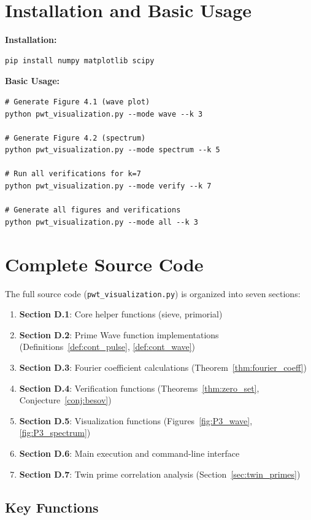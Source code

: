 ﻿\documentclass[12pt,a4paper]{report}
\theoremstyle{plain}
\theoremstyle{definition}
\begin{document}
\section{Installation and Basic Usage}

\textbf{Installation:}
\begin{verbatim}
pip install numpy matplotlib scipy
\end{verbatim}

\textbf{Basic Usage:}
\begin{verbatim}
# Generate Figure 4.1 (wave plot)
python pwt_visualization.py --mode wave --k 3

# Generate Figure 4.2 (spectrum)
python pwt_visualization.py --mode spectrum --k 5

# Run all verifications for k=7
python pwt_visualization.py --mode verify --k 7

# Generate all figures and verifications
python pwt_visualization.py --mode all --k 3
\end{verbatim}

\section{Complete Source Code}

The full source code (\texttt{pwt\_visualization.py}) is organized into seven sections:

\begin{enumerate}
    \item \textbf{Section D.1}: Core helper functions (sieve, primorial)
    \item \textbf{Section D.2}: Prime Wave function implementations (Definitions~\ref{def:cont_pulse}, \ref{def:cont_wave})
    \item \textbf{Section D.3}: Fourier coefficient calculations (Theorem~\ref{thm:fourier_coeff})
    \item \textbf{Section D.4}: Verification functions (Theorems~\ref{thm:zero_set}, Conjecture~\ref{conj:besov})
    \item \textbf{Section D.5}: Visualization functions (Figures~\ref{fig:P3_wave}, \ref{fig:P3_spectrum})
    \item \textbf{Section D.6}: Main execution and command-line interface
    \item \textbf{Section D.7}: Twin prime correlation analysis (Section~\ref{sec:twin_primes})
\end{enumerate}

\subsection{Key Functions}
\end{document}
